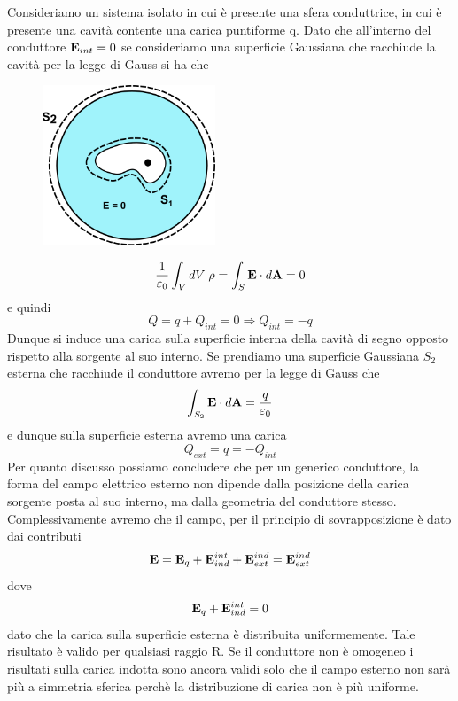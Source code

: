  Consideriamo un sistema isolato in cui \`e presente una sfera conduttrice, in cui \`e presente una cavit\`a contente una carica puntiforme q. Dato che all'interno del conduttore $\bold{E}_{int} = 0$ se consideriamo una superficie Gaussiana che racchiude la cavit\`a per la legge di Gauss si ha che 
 \begin{figure}  %
    \centering
    \includegraphics[width=0.46\textwidth]{images/inductor}  %
\end{figure}
 \begin{equation*}
 	\frac{1}{\varepsilon_0}\int_{V}dV \; \rho = \int_{S} \bold{E} \cdot d\bold{A} = 0
 \end{equation*}
 e quindi 
 \begin{equation*}
 	Q = q +Q_{int} = 0 \Rightarrow Q_{int} = -q
 \end{equation*}
 Dunque si induce una carica sulla superficie interna della cavit\`a di segno opposto rispetto alla sorgente al suo interno. Se prendiamo una superficie Gaussiana $S_2$ esterna che racchiude il conduttore avremo per la legge di Gauss che 
 \begin{equation*}
 	\int_{S_2}\bold{E} \cdot d\bold{A} = \frac{q}{\varepsilon_0}
 \end{equation*}
 e dunque sulla superficie esterna  avremo una carica
 \begin{equation*}
 	Q_{ext} = q = -Q_{int}
 \end{equation*}
 Per quanto discusso possiamo concludere che per un generico conduttore, la forma del campo elettrico esterno non dipende dalla posizione della carica sorgente posta al suo interno, ma dalla geometria del conduttore stesso. Complessivamente avremo che il campo, per il principio di sovrapposizione \`e dato dai contributi
 \begin{equation*}
 	\bold{E} = \bold{E}_q + \bold{E}_{ind}^{int} + \bold{E}_{ext}^{ind} = \bold{E}_{ext}^{ind}
 \end{equation*}
 dove 
 \begin{equation*}
 	\bold{E}_q + \bold{E}_{ind}^{int} = 0
 \end{equation*}
 dato che la carica sulla superficie esterna \`e distribuita uniformemente. Tale risultato \`e valido per qualsiasi raggio R. 
 Se il conduttore non \`e omogeneo  i risultati sulla carica indotta sono ancora validi solo che il campo esterno non sar\`a pi\`u a simmetria sferica perch\`e la distribuzione di carica non \`e pi\`u uniforme.
 
